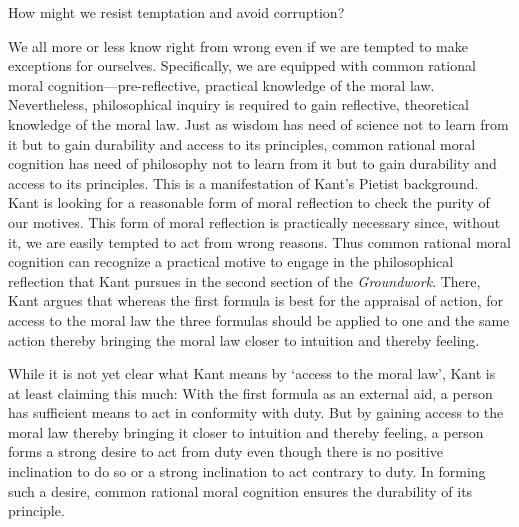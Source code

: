\documentclass[a4paper,12pt]{article}
\begin{document}
How might we resist temptation and avoid corruption?

We all more or less know right from wrong even if we are tempted to make exceptions for ourselves. Specifically, we are equipped with common rational moral cognition---pre-reflective, practical knowledge of the moral law. Nevertheless, philosophical inquiry is required to gain reflective, theoretical knowledge of the moral law. Just as wisdom has need of science not to learn from it but to gain durability and access to its principles, common rational moral cognition has need of philosophy not to learn from it but to gain durability and access to its principles. This is a manifestation of Kant's Pietist background. Kant is looking for a reasonable form of moral reflection to check the purity of our motives. This form of moral reflection is practically necessary since, without it, we are easily tempted to act from wrong reasons. Thus common rational moral cognition can recognize a practical motive to engage in the philosophical reflection that Kant pursues in the second section of the \emph{Groundwork}. There, Kant argues that whereas the first formula is best for the appraisal of action, for access to the moral law the three formulas should be applied to one and the same action thereby bringing the moral law closer to intuition and thereby feeling.

While it is not yet clear what Kant means by `access to the moral law', Kant is at least claiming this much: With the first formula as an external aid, a person has sufficient means to act in conformity with duty. But by gaining access to the moral law thereby bringing it closer to intuition and thereby feeling, a person forms a strong desire to act from duty even though there is no positive inclination to do so or a strong inclination to act contrary to duty. In forming such a desire, common rational moral cognition ensures the durability of its principle.
\end{document}
